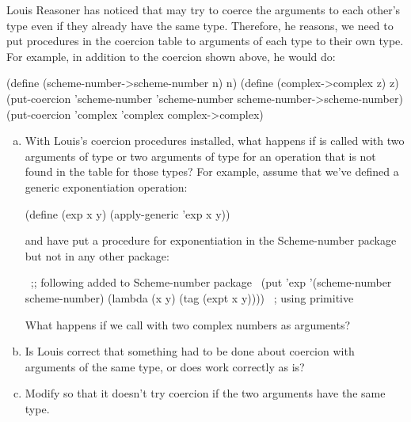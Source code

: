 \begin{exerciseGroup}
\label{Exercise 2.81}
 Louis Reasoner has noticed that
 may try to coerce the arguments to each other's type even
if they already have the same type.  Therefore, he reasons, we need to put
procedures in the coercion table to  arguments of each type to
their own type.  For example, in addition to the
 coercion shown above, he would do:

\begin{codeBlock}
(define (scheme-number->scheme-number n) n)
(define (complex->complex z) z)
(put-coercion 'scheme-number
              'scheme-number
              scheme-number->scheme-number)
(put-coercion 'complex 'complex complex->complex)
\end{codeBlock}

\begin{enumerate}[a.]

\item
With Louis's coercion procedures installed, what happens if
 is called with two arguments of type 
or two arguments of type  for an operation that is not found in
the table for those types?  For example, assume that we've defined a generic
exponentiation operation:

\begin{codeBlock}
(define (exp x y) (apply-generic 'exp x y))
\end{codeBlock}

\noindent
and have put a procedure for exponentiation in the Scheme-number
package but not in any other package:

\begin{codeBlock}
~\textrm{;; following added to Scheme-number package}~
(put 'exp '(scheme-number scheme-number)
     (lambda (x y) (tag (expt x y))))
     ~\textrm{; using primitive }~
\end{codeBlock}

\noindent
What happens if we call  with two complex numbers as arguments?

\item
Is Louis correct that something had to be done about coercion with arguments of
the same type, or does  work correctly as is?

\item
Modify  so that it doesn't try coercion if the two
arguments have the same type.


\end{enumerate}
\end{exerciseGroup}
